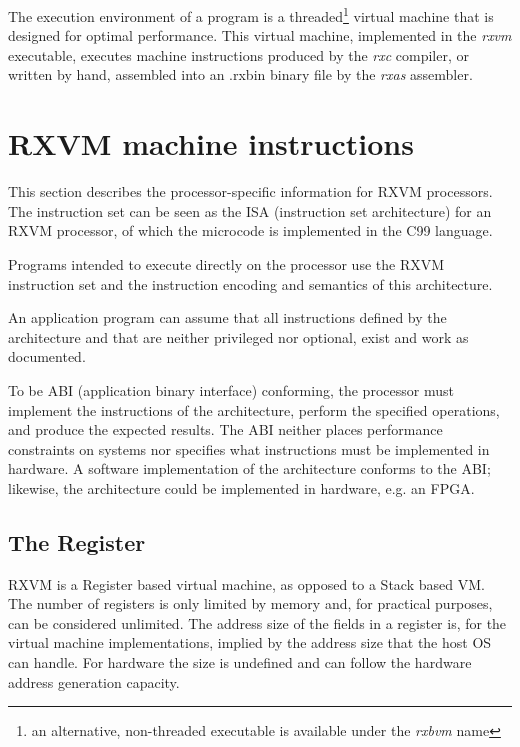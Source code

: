 The execution environment of a \crexx{} program is a
threaded\footnote{an alternative, non-threaded executable is available
  under the \emph{rxbvm} name} virtual
machine that is designed for optimal performance. This virtual
machine, implemented in the \emph{rxvm} executable, executes
machine instructions produced by the \emph{rxc} \crexx{}
compiler, or written by hand, assembled into an .rxbin binary file by
the \emph{rxas} assembler.



\section{RXVM machine instructions}

This section describes the processor-specific information for
RXVM processors. The instruction set can be seen as the ISA
(instruction set architecture) for
an RXVM processor, of which the microcode is implemented in the C99 language.

Programs intended to execute directly on the processor use the
RXVM instruction set and the
instruction encoding and semantics of this architecture.

An application program can assume that all instructions defined by the
architecture and that are neither privileged nor optional, exist and work
as documented.

To be ABI (application binary interface) conforming, the processor must implement the instructions of
the architecture, perform the specified operations, and produce the
expected results.  The ABI neither places performance constraints on
systems nor specifies what instructions must be implemented in
hardware.  A software implementation of the architecture conforms to
the ABI; likewise, the architecture could be implemented in hardware,
e.g. an FPGA.

\subsection{The Register}
RXVM is a Register based virtual machine, as opposed to a Stack based
VM. The number of registers is only limited by memory and, for
practical purposes, can be considered unlimited. The address size of
the fields in a register is, for the virtual machine implementations,
implied by the address size that the host OS can handle. For hardware
the size is undefined and can follow the hardware address generation
capacity.

